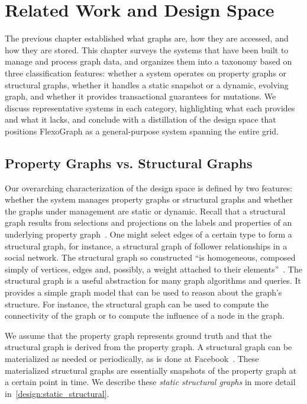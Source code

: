 \chapter{Related Work and Design Space}
\label{chap:design_space}
\label{sec:related-work}

The previous chapter established what graphs are, how they are accessed, and how they are stored.
This chapter surveys the systems that have been built to manage and process graph data, and organizes them into a taxonomy based on three classification features: whether a system operates on property graphs or structural graphs, whether it handles a static snapshot or a dynamic, evolving graph, and whether it provides transactional guarantees for mutations.
We discuss representative systems in each category, highlighting what each provides and what it lacks, and conclude with a distillation of the design space that positions FlexoGraph as a general-purpose system spanning the entire grid.


\section{Property Graphs vs. Structural Graphs}
\label{design:property_vs_structural}
Our overarching characterization of the design space is defined by two features: whether the system manages property graphs or structural graphs and whether the graphs under management are static or dynamic.
Recall that a structural graph results from selections and projections on the labels and properties of an underlying property graph~\cite{RodriguezNeubauer2010}.
One might select edges of a certain type to form a structural graph, for instance, a structural graph of follower relationships in a social network.
The structural graph so constructed ``is homogeneous, composed simply of vertices, edges and, possibly, a weight attached to their elements''~\cite{teseo2021deLeo}.
The structural graph is a useful abstraction for many graph algorithms and queries. It provides a simple graph model that can be used to reason about the graph's structure.
For instance, the structural graph can be used to compute the connectivity of the graph or to compute the influence of a node in the graph.

We assume that the property graph represents ground truth and that the structural graph is derived from the property graph.
A structural graph can be materialized as needed or periodically, as is done at Facebook~\cite{curtiss2013unicorn}.
These materialized structural graphs are essentially snapshots of the property graph at a certain point in time.
We describe these \emph{static structural graphs} in more detail in~\autoref{design:static_structural}.

